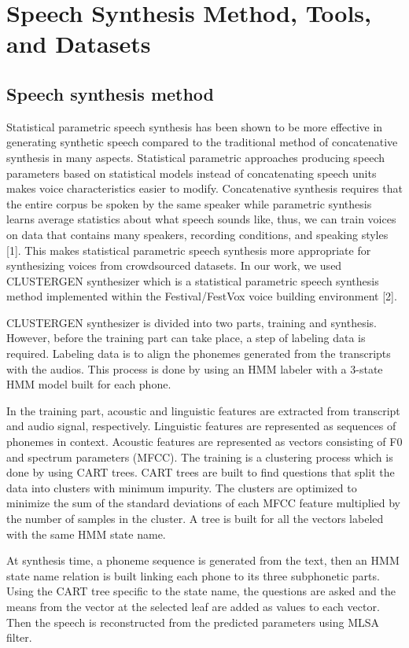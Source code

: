 \documentclass[12pt]{article}
\begin{document}
\clearpage
\section{Speech Synthesis Method, Tools, and Datasets}\label{sec_methodToolsDatasets}

\subsection{Speech synthesis method}
Statistical parametric speech synthesis has been shown to be more effective in generating synthetic speech compared to the traditional method of concatenative synthesis in many aspects. Statistical parametric approaches producing speech parameters based on statistical models instead of concatenating speech units makes voice characteristics easier to modify. Concatenative synthesis requires that the entire corpus be spoken by the same speaker while parametric synthesis learns average statistics about what speech sounds like, thus, we can train voices on data that contains many speakers, recording conditions, and speaking styles [1]. This makes statistical parametric speech synthesis more appropriate for synthesizing voices from crowdsourced datasets. In our work, we used CLUSTERGEN synthesizer which is a statistical parametric speech synthesis method implemented within the Festival/FestVox voice building environment [2].

CLUSTERGEN synthesizer is divided into two parts, training and synthesis. However, before the training part can take place, a step of labeling data is required. Labeling data is to align the phonemes generated from the transcripts with the audios. This process is done by using an HMM labeler with a 3-state HMM model built for each phone.

In the training part, acoustic and linguistic features are extracted from transcript and audio signal, respectively. Linguistic features are represented as sequences of phonemes in context. Acoustic features are represented as vectors consisting of F0 and spectrum parameters (MFCC). The training is a clustering process which is done by using CART trees. CART trees are built to find questions that split the data into clusters with minimum impurity. The clusters are optimized to minimize the sum of the standard deviations of each MFCC feature multiplied by the number of samples in the cluster. A tree is built for all the vectors labeled with the same HMM state name.

At synthesis time, a phoneme sequence is generated from the text, then an HMM state name relation is built linking each phone to its three subphonetic parts. Using the CART tree specific to the state name, the questions are asked and the means from the vector at the selected leaf are added as values to each vector. Then the speech is reconstructed from the predicted parameters using MLSA filter.
\end{document}
